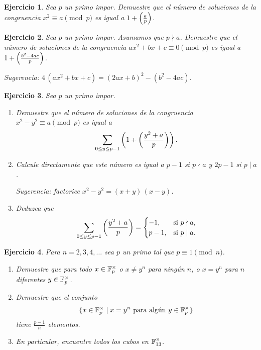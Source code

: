 \documentclass{article}
\theoremstyle{plain}
\newtheorem{ejerc}{Ejercicio}
\begin{document}
\begin{ejerc}
  Sea $p$ un primo impar. Demuestre que el número de soluciones de la
  congruencia $x^2 \equiv a \pmod{p}$ es igual a $1 + \left(\frac{a}{p}\right)$.
\end{ejerc}

\begin{ejerc}
  Sea $p$ un primo impar. Asumamos que $p \nmid a$. Demuestre que el número de
  soluciones de la congruencia $ax^2 + bx + c \equiv 0 \pmod{p}$ es igual a
  $1 + \left(\frac{b^2 - 4ac}{p}\right)$.

  Sugerencia: $4\,(ax^2 + bx + c) = (2ax + b)^2 - (b^2 - 4ac)$.
\end{ejerc}

\begin{ejerc}
  Sea $p$ un primo impar.

  \begin{enumerate}
  \item[1)] Demuestre que el número de soluciones de la congruencia
    $x^2 - y^2 \equiv a \pmod{p}$ es igual a
    $$\sum_{0 \le y \le p-1} \left(1 + \left(\frac{y^2+a}{p}\right)\right).$$

  \item[2)] Calcule directamente que este número es igual a $p-1$ si $p \nmid a$
    y $2p - 1$ si $p \mid a$.

    Sugerencia: factorice $x^2 - y^2 = (x+y)\,(x-y)$.

  \item[3)] Deduzca que
    $$\sum_{0 \le y \le p-1} \left(\frac{y^2+a}{p}\right) = \begin{cases}
      -1, & \text{si } p \nmid a,\\
      p-1, & \text{si } p \mid a.
    \end{cases}$$
  \end{enumerate}
\end{ejerc}

\begin{ejerc}
  Para $n = 2,3,4,\ldots$ sea $p$ un primo tal que $p \equiv 1 \pmod{n}$.

  \begin{enumerate}
  \item[1)] Demuestre que para todo $x\in \mathbb{F}_p^\times$ o $x \ne y^n$ para
    ningún $n$, o $x = y^n$ para $n$ diferentes $y \in \mathbb{F}_p^\times$.

  \item[2)] Demuestre que el conjunto
    $$\{ x\in \mathbb{F}_p^\times \mid x = y^n\text{ para algún }y\in\mathbb{F}_p^\times \}$$
    tiene $\frac{p-1}{n}$ elementos.

  \item[3)] En particular, encuentre todos los cubos en $\mathbb{F}_{13}^\times$.
  \end{enumerate}
\end{ejerc}
\end{document}
